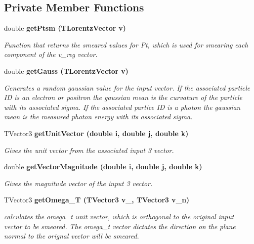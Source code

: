 \subsection*{Private Member Functions}
\begin{CompactItemize}
\item 
double \bf{get\-Ptsm} (TLorentz\-Vector v)
\begin{CompactList}\small\item\em Function that returns the smeared values for Pt, which is used for smearing each component of the v\_\-reg vector. \item\end{CompactList}\item 
double \bf{get\-Gauss} (TLorentz\-Vector v)
\begin{CompactList}\small\item\em Generates a random gaussian value for the input vector. If the associated particle ID is an electron or positron the gaussian mean is the curvature of the particle with its associated sigma. If the associated partice ID is a photon the gaussian mean is the measured photon energy with its associated sigma. \item\end{CompactList}\item 
TVector3 \bf{get\-Unit\-Vector} (double i, double j, double k)
\begin{CompactList}\small\item\em Gives the unit vector from the associated input 3 vector. \item\end{CompactList}\item 
double \bf{get\-Vector\-Magnitude} (double i, double j, double k)
\begin{CompactList}\small\item\em Gives the magnitude vector of the input 3 vector. \item\end{CompactList}\item 
TVector3 \bf{get\-Omega\_\-T} (TVector3 v\_, TVector3 v\_\-n)
\begin{CompactList}\small\item\em calculates the omega\_\-t unit vector, which is orthogonal to the original input vector to be smeared. The omega\_\-t vector dictates the direction on the plane normal to the orignal vector will be smeared. \item\end{CompactList}\item 

\end{CompactItemize}

